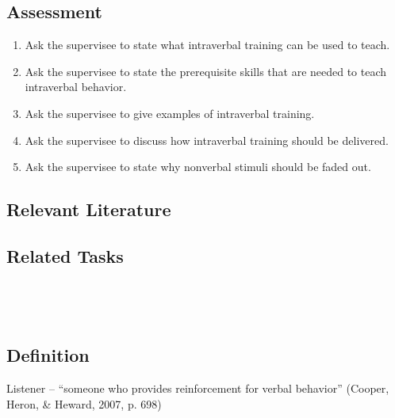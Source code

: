 \subsection{Assessment}
\begin{enumerate}
\item Ask the supervisee to state what intraverbal training can be used to teach.
\item Ask the supervisee to state the prerequisite skills that are needed to teach intraverbal behavior.  
\item Ask the supervisee to give examples of intraverbal training.
\item Ask the supervisee to discuss how intraverbal training should be delivered.
\item Ask the supervisee to state why nonverbal stimuli should be faded out.
\end{enumerate}
%
\subsection{Relevant Literature}
\begin{refsection}
\nocite{test,alang2017police,clayton2018black}
\printbibliography[heading=none]
\end{refsection}
%
\subsection{Related Tasks}
\fourdThirteen{}\\
\fourFKFourtySix{}\\
%
%
%
%
%
%
%
\section{\fourdFourteen{}}
\subsection{Definition}
Listener – ``someone who provides reinforcement for verbal behavior'' (Cooper, Heron, \& Heward, 2007, p. 698)

